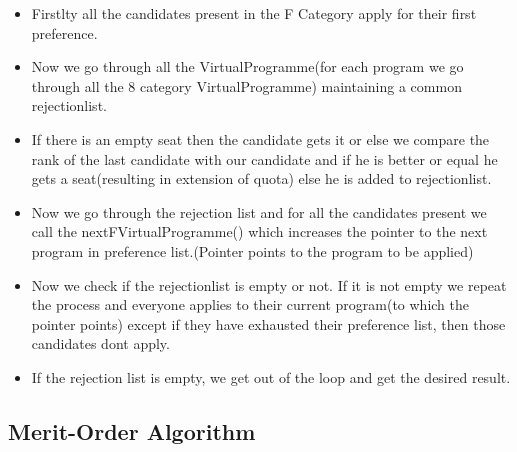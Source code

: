 \documentclass{article}
\begin{document}
\hspace*{5 mm} \\
\hspace*{5 mm} \\
\hspace*{5 mm} \\
\hspace*{5 mm} \\
\hspace*{5 mm}{\LARGE Now F allocation takes place:}
\hspace*{5 mm} \\
\begin{itemize}
  \item Firstlty all the candidates present in the F Category apply for their first preference.
  \item Now we go through all the VirtualProgramme(for each program we go through all the 8 category VirtualProgramme) maintaining a common rejectionlist.
  \item If there is an empty seat then the candidate gets it or else we compare the rank of the last candidate with our candidate and if he is better or equal he gets a seat(resulting in extension of quota) else he is added to rejectionlist. 
  \item Now we go through the rejection list and for all the candidates present we call the nextFVirtualProgramme() which increases the pointer to the next program in preference list.(Pointer points to the program to be applied)
  \item Now we check if the rejectionlist is empty or not. If it is not empty we repeat the process and everyone applies to their current program(to which the pointer points) except if they have exhausted their preference list, then those candidates dont apply.
  \item If the rejection list is empty, we get out of the loop and get the desired result.
\end{itemize}
\pagebreak
\begin{center}
\section*{Merit-Order Algorithm}
\end{center}
\hspace*{5 mm} \\
\hspace*{5 mm} \\
\hspace*{5 mm} \\
\end{document}
